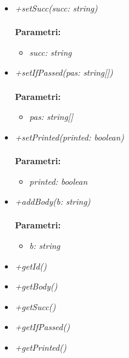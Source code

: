 \begin{itemize}
\begin{itemize}
\begin{itemize}
    		\end{itemize}
    		\item \emph{+setSucc(succ: string)}\\
    		\\
    		\textbf{Parametri:}
    		\begin{itemize}
    			\item \emph{succ: string}\\
    			
    		\end{itemize}
    		\item \emph{+setIfPassed(pas: string[])}\\
    		\\
    		\textbf{Parametri:}
    		\begin{itemize}
    			\item \emph{pas: string[]}\\
    			
    		\end{itemize}
    		\item \emph{+setPrinted(printed: boolean)}\\
    		\\
    		\textbf{Parametri:}
    		\begin{itemize}
    			\item \emph{printed: boolean}\\
    			
    		\end{itemize}
    		\item \emph{+addBody(b: string)}\\
    		\\
    		\textbf{Parametri:}
    		\begin{itemize}
    			\item \emph{b: string}\\
    			
    		\end{itemize}
    		\item \emph{+getId()}\\
    		
    		\item \emph{+getBody()}\\
    		
    		\item \emph{+getSucc()}\\
    		
    		\item \emph{+getIfPassed()}\\
    		
    		\item \emph{+getPrinted()}\\
    		
    	\end{itemize}
\end{itemize}
